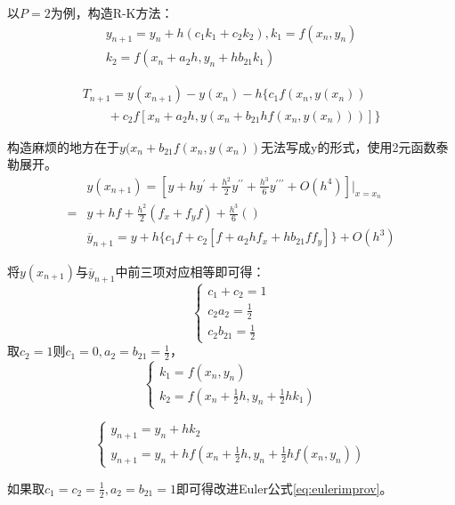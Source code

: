 \documentclass{article}
\begin{document}
以$P=2$为例，构造R-K方法：
$$
\begin{array}{lr}
    y_{n+1} = y_n + h(c_1k_1+c_2k_2), k_1=f(x_n, y_n)\\
    k_2 = f(x_n+a_2h, y_n+hb_{21}k_1)
\end{array}
$$

\begin{equation*}
    \begin{array}{lr}
        T_{n+1}=y(x_{n+1})-y(x_n)-h\{c_1f(x_n, y(x_n)) \\
        \quad \quad +c_2f[x_n+a_2h, y(x_n+b_{21}hf(x_n, y(x_n)))]\}
    \end{array}
\end{equation*}

构造麻烦的地方在于$y(x_n+b_{21}f(x_n, y(x_n))$无法写成y的形式，使用2元函数泰勒展开。
\begin{equation*}
    \begin{split}
        &y(x_{n+1})=[y+hy^{'}+\frac{h^2}{2}y^{{'}{'}}+\frac{h^3}{6}y^{{'}{'}{'}}+O(h^4)]|_{x=x_n}\\
        =&y+hf+\frac{h^2}{2}(f_x+f_yf)+\frac{h^3}{6}() \\
        &\overline{y}_{n+1} = y + h\{c_1f + c_2[f+a_2hf_x+hb_{21}ff_y]\} + O(h^3)
    \end{split}
\end{equation*}

将$y(x_{n+1})$与$\overline{y}_{n+1}$中前三项对应相等即可得：
$$
\left\{
\begin{array}{lr}
    c_1+c_2 = 1 \\
    c_2a_2 = \frac{1}{2} \\
    c_2b_{21} = \frac{1}{2}
\end{array}\right.
$$
取$c_2=1$则$c_1=0,a_2=b_{21}=\frac{1}{2}$，
$$
\left\{
\begin{array}{lr}
    k_1 = f(x_n, y_n) \\
    k_2 = f(x_n+\frac{1}{2}h, y_n+\frac{1}{2}hk_1)
\end{array}\right.
$$

\begin{equation}
    \left\{
        \begin{array}{lr}
            y_{n+1} = y_n+hk_2 \\
            y_{n+1} = y_n+hf(x_n+\frac{1}{2}h, y_n+\frac{1}{2}hf(x_n, y_n))
        \end{array}
        \right.
\end{equation}

如果取$c_1=c_2=\frac{1}{2}, a_2=b_{21}=1$即可得改进Euler公式\ref{eq:eulerimprov}。
\end{document}
